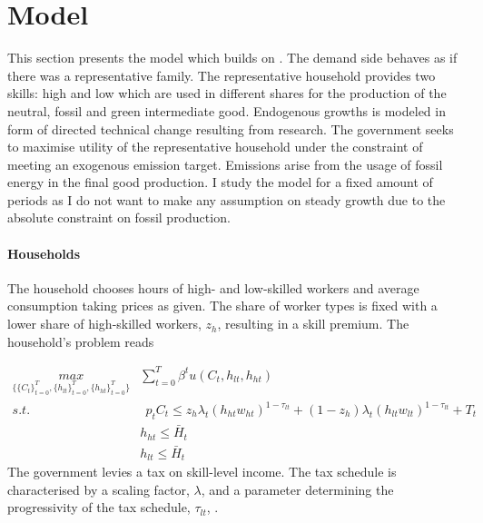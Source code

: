 
\section{Model}
This section presents the model which builds on \cite{Fried2018ClimateAnalysis}. 
The demand side behaves as if there was a representative family. The representative household provides two skills: high and low which are used in different shares for the production of the neutral, fossil and green intermediate good.
Endogenous growths is modeled in form of directed technical change resulting from research. The government seeks to maximise utility of the representative household under the constraint of meeting an exogenous emission target. Emissions arise from the usage of fossil energy in the final good production. 
I study the model for a fixed amount of periods as I do not want to make any assumption on steady growth due to the absolute constraint on fossil production. 

\paragraph{Households}
 The household chooses hours of high- and low-skilled workers and average consumption taking prices as given. The share of worker types is fixed with a lower share of high-skilled workers, $z_h$, resulting in a skill premium. The household's problem reads

\begin{align}
\underset{\{\{C_{t}\}_{t=0}^{T}, \{h_{lt}\}_{t=0}^{T}, \{h_{ht}\}_{t=0}^{T}\}}{max}&
\sum_{t=0}^{T}\beta^t u(C_{t}, h_{lt}, h_{ht})\\
s.t.& \ \ p_{t}C_{t}\leq%
z_h\lambda_t \left(h_{ht}w_{ht}\right)^{1-\tau_{lt}}+(1-z_h)\lambda_t\left(h_{lt}w_{lt}\right)^{1-\tau_{lt}}+T_t\\
\ & h_{ht}\leq \bar{H}_t\\
\ & h_{lt}\leq \bar{H}_t
\end{align}
The government levies a tax on skill-level income. The tax schedule is characterised by  a scaling factor, $\lambda$, and a parameter determining the progressivity of the tax schedule, $\tau_{lt}$, \citep[compare, e.g.,][]{Heathcote2017OptimalFramework}. 

